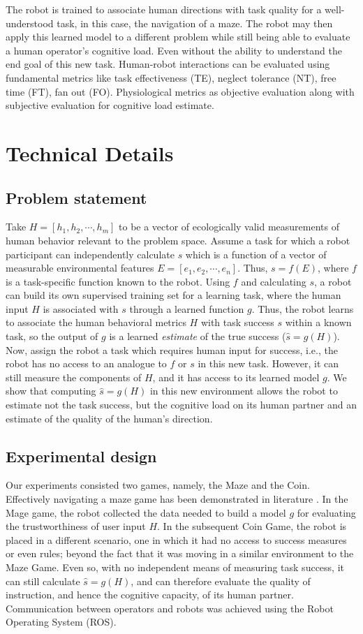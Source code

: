 \documentclass{sig-alternate}
\begin{document}
The robot is trained to associate human directions with task quality for a well-understood task, in this case, the
navigation of a maze. The robot may then apply this learned model to a
different problem while still being able to evaluate a human operator's
cognitive load. Even without the ability to understand the end goal of this
new task. Human-robot interactions can be evaluated using fundamental metrics
\cite{olsen2003metrics} like task effectiveness (TE), neglect tolerance (NT), free time (FT), fan out (FO).
Physiological metrics as objective evaluation along with subjective evaluation for cognitive load estimate\cite{Brookings1996361}.

\section{Technical Details} \subsection{Problem statement} Take $H=[h_1,h_2,\cdots,h_m]$ to be a vector of ecologically
valid measurements of human behavior relevant to the problem space.  Assume a task for which a robot participant can
independently calculate $s$ which is a function of a vector of measurable environmental features
$E=[e_1,e_2,\cdots,e_n]$.  Thus, $s = f(E)$, where $f$ is a task-specific function known to the robot.  Using $f$ and
calculating $s$, a robot can build its own supervised training set for a learning task, where the human input $H$ is
associated with $s$ through a learned function $g$.  Thus, the robot learns to associate the human behavioral metrics
$H$ with task success $s$ within a known task, so the output of $g$ is a learned \emph{estimate} of the true success
($\hat{s}=g(H)$).  Now, assign the robot a task which requires human input for success, i.e., the robot has no access to
an analogue to $f$ or $s$ in this new task.  However, it can still measure the components of $H$, and it has access to
its learned model $g$.  We show that computing $\hat{s}=g(H)$ in this new environment allows the robot to estimate not
the task success, but the cognitive load on its human partner and an estimate of the quality of the human's direction.
\subsection{Experimental design} Our experiments consisted two games, namely, the Maze and the Coin. Effectively
navigating a maze game has been demonstrated in literature \cite{crick2011human}. In the Mage game, the robot collected
the data needed to build a model $g$ for evaluating the trustworthiness of user input $H$. In the subsequent Coin Game,
the robot is placed in a different scenario, one in which it had no access to success measures or even rules; beyond the
fact that it was moving in a similar environment to the Maze Game. Even so, with no independent means of measuring task
success, it can still calculate $\hat{s}=g(H)$, and can therefore evaluate the quality of instruction, and hence the
cognitive capacity, of its human partner. Communication between operators and robots was achieved using the Robot Operating System (ROS).
\end{document}
